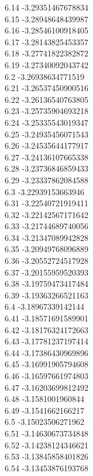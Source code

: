 {6.14	-3.29351467678834\\
6.15	-3.28948648439987\\
6.16	-3.28546100918405\\
6.17	-3.28143825453357\\
6.18	-3.27741822382872\\
6.19	-3.27340092043742\\
6.2	-3.26938634771519\\
6.21	-3.26537450900516\\
6.22	-3.26136540763805\\
6.23	-3.25735904693218\\
6.24	-3.25335543019347\\
6.25	-3.24935456071543\\
6.26	-3.24535644177917\\
6.27	-3.24136107665338\\
6.28	-3.23736846859433\\
6.29	-3.23337862084588\\
6.3	-3.22939153663946\\
6.31	-3.22540721919411\\
6.32	-3.22142567171642\\
6.33	-3.21744689740056\\
6.34	-3.21347089942828\\
6.35	-3.20949768096889\\
6.36	-3.20552724517928\\
6.37	-3.20155959520393\\
6.38	-3.19759473417484\\
6.39	-3.19363266521163\\
6.4	-3.18967339142144\\
6.41	-3.18571691589901\\
6.42	-3.18176324172663\\
6.43	-3.17781237197414\\
6.44	-3.17386430969896\\
6.45	-3.16991905794608\\
6.46	-3.16597661974803\\
6.47	-3.16203699812492\\
6.48	-3.1581001960844\\
6.49	-3.1541662166217\\
6.5	-3.15023506271962\\
6.51	-3.14630673734848\\
6.52	-3.14238124346621\\
6.53	-3.13845858401826\\
6.54	-3.13453876193768\\
}

